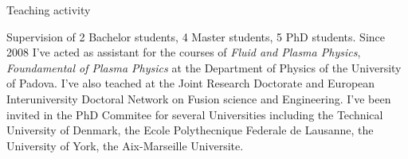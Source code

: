 \begin{cvblock}{Teaching activity}
\end{cvblock}
Supervision of 2 Bachelor students, 4 Master students, 5 PhD
students. Since 2008 I've acted as assistant for the courses of
\emph{Fluid and Plasma Physics}, \emph{Foundamental of Plasma Physics}
at the Department of Physics of the University of Padova. I've also
teached at the Joint Research Doctorate and European Interuniversity
Doctoral Network on Fusion science and Engineering. I've been invited
in the PhD Commitee for several Universities including the Technical
University of Denmark,  the Ecole Polythecnique Federale de Lausanne,
the University of York,  the Aix-Marseille Universite.\\
